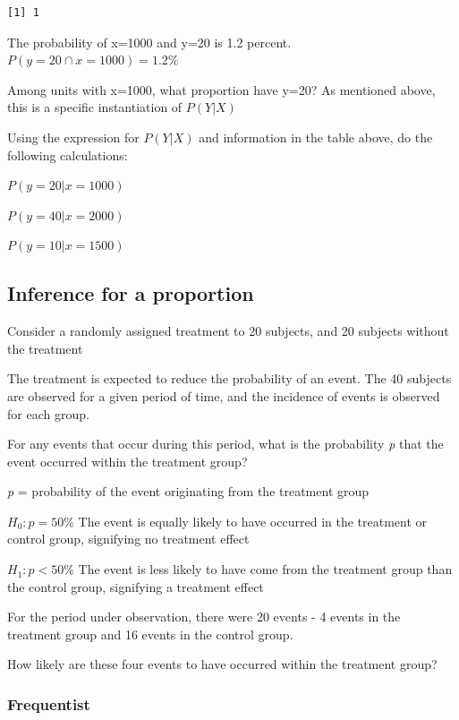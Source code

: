 \documentclass[
  letterpaper,
  DIV=11,
  numbers=noendperiod,
  oneside]{scrartcl}
\begin{document}
\begin{verbatim}
[1] 1
\end{verbatim}

The probability of x=1000 and y=20 is 1.2 percent.
\(P(y=20\cap x=1000)=1.2\%\)

Among units with x=1000, what proportion have y=20? As mentioned above,
this is a specific instantiation of \(P(Y|X)\)

Using the expression for \(P(Y|X)\) and information in the table above,
do the following calculations:

\(P(y=20|x=1000)\)

\(P(y=40|x=2000)\)

\(P(y=10|x=1500)\)

\hypertarget{inference-for-a-proportion}{%
\subsection{Inference for a
proportion}\label{inference-for-a-proportion}}

Consider a randomly assigned treatment to 20 subjects, and 20 subjects
without the treatment

The treatment is expected to reduce the probability of an event. The 40
subjects are observed for a given period of time, and the incidence of
events is observed for each group.

For any events that occur during this period, what is the probability
\emph{p} that the event occurred within the treatment group?

\emph{p} = probability of the event originating from the treatment group

\(H_0: p=50\%\) The event is equally likely to have occurred in the
treatment or control group, signifying no treatment effect

\(H_1: p \lt 50\%\) The event is less likely to have come from the
treatment group than the control group, signifying a treatment effect

For the period under observation, there were 20 events - 4 events in the
treatment group and 16 events in the control group.

How likely are these four events to have occurred within the treatment
group?

\hypertarget{frequentist}{%
\subsubsection{Frequentist}\label{frequentist}}
\end{document}
